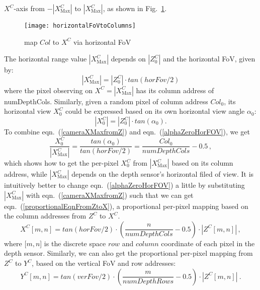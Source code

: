 \(X^C\)-axis from \(-|X^C_{\text{Max}}|\) to \(|X^C_{\text{Max}}|\), as shown in Fig.~\ref{horizontalFoVtoColumns}. %
\begin{figure}[!t]
\centering
\texttt{[image: horizontalFoVtoColumns]}
\caption{map \(Col\) to \(X^C\) via horizontal FoV}
\label{horizontalFoVtoColumns}
\end{figure}%
%
The horizontal range value \(|X^C_{\text{Max}}|\) depends on \(|Z^C_0|\) and the horizontal FoV, given by:
%
\begin{equation}
|X^C_{\text{Max}}| = |Z^C_0| \cdot tan(horFov / 2) 
\label{cameraXMaxfromZ}
\end{equation}%
\noindent
where the pixel observing on \(X^C = |X^C_{\text{Max}}|\) has its column address of numDepthCols. Similarly, given a random pixel of column address \(Col_0\), its horizontal view \(X^C_0\) could be expressed based on its own horizontal view angle \(\alpha_0\):
%
\begin{equation}
|X^C_{0}| = |Z^C_0| \cdot tan(\alpha_0)  .
\label{alphaZeroHorFOV}
\end{equation}%
\noindent
To combine eqn.~(\ref{cameraXMaxfromZ}) and eqn.~(\ref{alphaZeroHorFOV}), we get
%
\begin{equation}
\frac{X^C_0}{|X^C_{\text{Max}}|} = \frac{tan(\alpha_0)}{tan(horFov / 2)} = \frac{Col_0}{numDepthCols} - 0.5 \, ,
\label{alphaZeroHorFOV}
\end{equation}%
\noindent
which shows how to get the per-pixel \(X^C_0\) from \(|X^C_{\text{Max}}|\) based on its column address, while \(|X^C_{\text{Max}}|\) depends on the depth sensor's horizontal filed of view. It is intuitively better to change eqn.~(\ref{alphaZeroHorFOV}) a little by substituting \(|X^C_{\text{Max}}|\) with eqn.~(\ref{cameraXMaxfromZ}) such that we can get eqn.~(\ref{proportionalEqnFromZtoX}), a proportional per-pixel mapping based on the column addresses from \(Z^C\) to \(X^C\).
%
\begin{equation}
X^C[m, n] = tan(horFov / 2) \cdot (\frac{n}{numDepthCols} - 0.5) \cdot |Z^C[m, n]|\, ,
\label{proportionalEqnFromZtoX}
\end{equation}%
\noindent
where [\(m,n\)] is the discrete space \(row\) and \(column\) coordinate of each pixel in the depth sensor. Similarly, we can also get the proportional per-pixel mapping from \(Z^C\) to \(Y^C\), based on the vertical FoV and row addresses:
%
\begin{equation}
Y^C[m, n] = tan(verFov / 2) \cdot (\frac{m}{numDepthRows} - 0.5) \cdot |Z^C[m, n]| \  .
\label{proportionalEqnFromZtoY}
\end{equation}%
